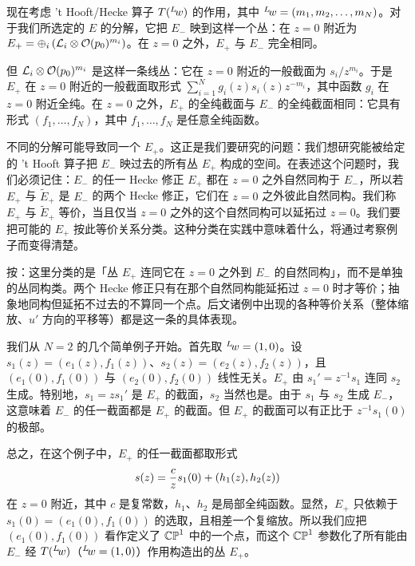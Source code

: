 现在考虑 't Hooft/Hecke 算子 $T(^L\negthinspace w)$ 的作用，其中 $^L\negthinspace w=(m_1,m_2,\dots,m_N)$。对于我们所选定的 $E$ 的分解，它把 $E_-$ 映到这样一个丛：在 $z=0$ 附近为 $E_+=\oplus_i\left( {\cal L}_i\otimes {\cal O}(p_0)^{m_i}\right)$。在 $z=0$ 之外，$E_+$ 与 $E_-$ 完全相同。

但 ${\cal L}_i\otimes {\cal O}(p_0)^{m_i}$ 是这样一条线丛：它在 $z=0$ 附近的一般截面为 $s_i/z^{m_i}$。于是 $E_+$ 在 $z=0$ 附近的一般截面取形式 $\sum_{i=1}^N g_i(z) s_i(z)z^{-m_i}$，其中函数 $g_i$ 在 $z=0$ 附近全纯。在 $z=0$ 之外，$E_+$ 的全纯截面与 $E_-$ 的全纯截面相同：它具有形式 $(f_1,\dots,f_N)$，其中 $f_1,\dots,f_N$ 是任意全纯函数。

不同的分解可能导致同一个 $E_+$。这正是我们要研究的问题：我们想研究能被给定的 't Hooft 算子把 $E_-$ 映过去的所有丛 $E_+$ 构成的空间。在表述这个问题时，我们必须记住：$E_-$ 的任一 Hecke 修正 $E_+$ 都在 $z=0$ 之外自然同构于 $E_-$，所以若 $E_+$ 与 $\tilde E_+$ 是 $E_-$ 的两个 Hecke 修正，它们在 $z=0$ 之外彼此自然同构。我们称 $E_+$ 与 $\tilde E_+$ 等价，当且仅当 $z=0$ 之外的这个自然同构可以延拓过 $z=0$。我们要把可能的 $E_+$ 按此等价关系分类。这种分类在实践中意味着什么，将通过考察例子而变得清楚。

\begin{yizhu}[易错点]
按：这里分类的是「丛 $E_+$ 连同它在 $z=0$ 之外到 $E_-$ 的自然同构」，而不是单独的丛同构类。两个 Hecke 修正只有在那个自然同构能延拓过 $z=0$ 时才等价；抽象地同构但延拓不过去的不算同一个点。后文诸例中出现的各种等价关系（整体缩放、$u'$ 方向的平移等）都是这一条的具体表现。
\end{yizhu}

我们从 $N=2$ 的几个简单例子开始。首先取 $^L\negthinspace w=(1,0)$。设 $s_1(z)=(e_1(z),f_1(z))$、$s_2(z)=(e_2(z),f_2(z))$，且 $(e_1(0),f_1(0))$ 与 $(e_2(0),f_2(0))$ 线性无关。$E_+$ 由 $s_1'=z^{-1}s_1$ 连同 $s_2$ 生成。特别地，$s_1=zs_1'$ 是 $E_+$ 的截面，$s_2$ 当然也是。由于 $s_1$ 与 $s_2$ 生成 $E_-$，这意味着 $E_-$ 的任一截面都是 $E_+$ 的截面。但 $E_+$ 的截面可以有正比于 $z^{-1}s_1(0)$ 的极部。

总之，在这个例子中，$E_+$ 的任一截面都取形式
\setcounter{equation}{15}
\begin{equation}\label{eq:milok}
s(z)={c\over z}s_1(0)+(h_1(z),h_2(z))
\end{equation}
在 $z=0$ 附近，其中 $c$ 是复常数，$h_1$、$h_2$ 是局部全纯函数。显然，$E_+$ 只依赖于 $s_1(0)=(e_1(0),f_1(0))$ 的选取，且相差一个复缩放。所以我们应把 $(e_1(0),f_1(0))$ 看作定义了 $\Bbb{CP}^1$ 中的一个点，而这个 $\Bbb{CP}^1$ 参数化了所有能由 $E_-$ 经 $T(^L\negthinspace w)$（$^L\negthinspace w=(1,0)$）作用构造出的丛 $E_+$。

